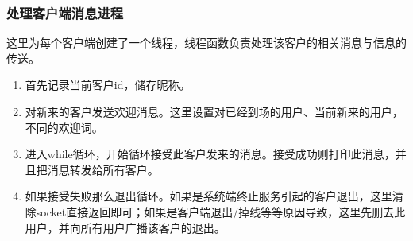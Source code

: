 \documentclass[12pt]{article}
\begin{document}
\subsubsection{处理客户端消息进程}
这里为每个客户端创建了一个线程，线程函数负责处理该客户的相关消息与信息的传送。
\begin{enumerate}
    \item 首先记录当前客户id，储存昵称。
    \item 对新来的客户发送欢迎消息。这里设置对已经到场的用户、当前新来的用户，不同的欢迎词。
    \item 进入while循环，开始循环接受此客户发来的消息。接受成功则打印此消息，并且把消息转发给所有客户。
    \item 如果接受失败那么退出循环。如果是系统端终止服务引起的客户退出，这里清除socket直接返回即可；如果是客户端退出/掉线等等原因导致，这里先删去此用户，并向所有用户广播该客户的退出。
\end{enumerate}
\end{document}
